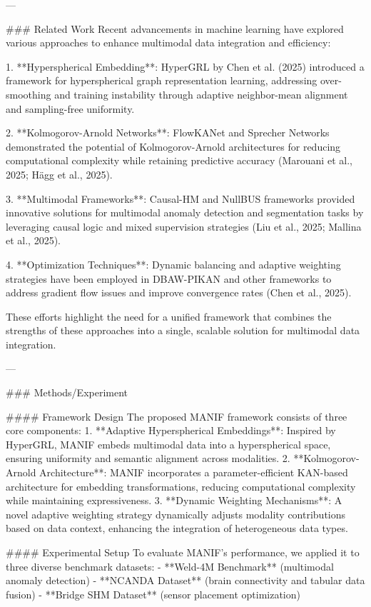 ---

### Related Work
Recent advancements in machine learning have explored various approaches to enhance multimodal data integration and efficiency:

1. **Hyperspherical Embedding**: HyperGRL by Chen et al. (2025) introduced a framework for hyperspherical graph representation learning, addressing over-smoothing and training instability through adaptive neighbor-mean alignment and sampling-free uniformity.

2. **Kolmogorov-Arnold Networks**: FlowKANet and Sprecher Networks demonstrated the potential of Kolmogorov-Arnold architectures for reducing computational complexity while retaining predictive accuracy (Marouani et al., 2025; Hägg et al., 2025).

3. **Multimodal Frameworks**: Causal-HM and NullBUS frameworks provided innovative solutions for multimodal anomaly detection and segmentation tasks by leveraging causal logic and mixed supervision strategies (Liu et al., 2025; Mallina et al., 2025).

4. **Optimization Techniques**: Dynamic balancing and adaptive weighting strategies have been employed in DBAW-PIKAN and other frameworks to address gradient flow issues and improve convergence rates (Chen et al., 2025).

These efforts highlight the need for a unified framework that combines the strengths of these approaches into a single, scalable solution for multimodal data integration.

---

### Methods/Experiment

#### Framework Design
The proposed MANIF framework consists of three core components:
1. **Adaptive Hyperspherical Embeddings**: Inspired by HyperGRL, MANIF embeds multimodal data into a hyperspherical space, ensuring uniformity and semantic alignment across modalities.
2. **Kolmogorov-Arnold Architecture**: MANIF incorporates a parameter-efficient KAN-based architecture for embedding transformations, reducing computational complexity while maintaining expressiveness.
3. **Dynamic Weighting Mechanisms**: A novel adaptive weighting strategy dynamically adjusts modality contributions based on data context, enhancing the integration of heterogeneous data types.

#### Experimental Setup
To evaluate MANIF's performance, we applied it to three diverse benchmark datasets:
- **Weld-4M Benchmark** (multimodal anomaly detection)
- **NCANDA Dataset** (brain connectivity and tabular data fusion)
- **Bridge SHM Dataset** (sensor placement optimization)

